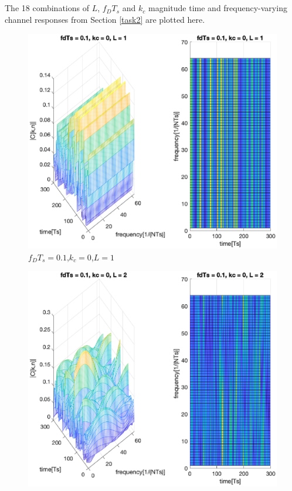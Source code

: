 \documentclass[conference]{IEEEtran}
\begin{document}
\newpage
\begin{appendices}
\section{}

    The 18 combinations of $L$, $f_{D}T_{s}$ and $k_{c}$ magnitude time and frequency-varying channel responses from Section \ref{task2} are plotted here.

    \begin{figure}[H]
        \centering
        \includegraphics[width = \linewidth]{Task2/01_0_1.eps}
        \caption{$f_{D}T_{s}=0.1$,$k_{c}=0$,$L=1$}
        \label{01_0_1}
    \end{figure}
    \begin{figure}[H]
        \centering
        \includegraphics[width=\linewidth]{Task2/01_0_2.eps}

\end{figure}
\end{appendices}
\end{document}
